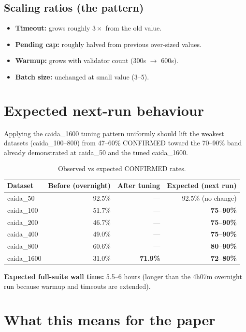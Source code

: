 \documentclass[10pt,a4paper]{article}
\newcommand{\good}[1]{\textcolor{good}{\textbf{#1}}}
\begin{document}
\subsection*{Scaling ratios (the pattern)}

\begin{itemize}
\item \textbf{Timeout:} grows roughly $3\times$ from the old value.
\item \textbf{Pending cap:} roughly halved from previous over-sized
  values.
\item \textbf{Warmup:} grows with validator count (300s $\to$ 600s).
\item \textbf{Batch size:} unchanged at small value (3--5).
\end{itemize}

\section{Expected next-run behaviour}

Applying the caida\_1600 tuning pattern uniformly should lift the
weakest datasets (caida\_100--800) from 47--60\% CONFIRMED toward the
70--90\% band already demonstrated at caida\_50 and the tuned
caida\_1600.

\begin{table}[h]
\centering
\caption{Observed vs expected CONFIRMED rates.}
\begin{tabular}{lrrr}
\toprule
Dataset & Before (overnight) & After tuning & Expected (next run) \\
\midrule
caida\_50 & 92.5\% & --- & 92.5\% (no change) \\
caida\_100 & 51.7\% & --- & \good{75--90\%} \\
caida\_200 & 46.7\% & --- & \good{75--90\%} \\
caida\_400 & 49.0\% & --- & \good{75--90\%} \\
caida\_800 & 60.6\% & --- & \good{80--90\%} \\
caida\_1600 & 31.0\% & \good{71.9\%} & \good{72--80\%} \\
\bottomrule
\end{tabular}
\end{table}

\textbf{Expected full-suite wall time:} 5.5--6 hours (longer than the
4h07m overnight run because warmup and timeouts are extended).

\section{What this means for the paper}
\end{document}
